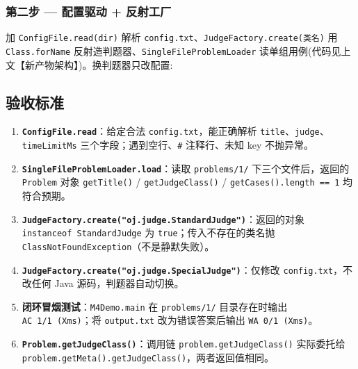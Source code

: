 \documentclass[
  11pt,
]{ctexart}
\newenvironment{Shaded}{\begin{snugshade}}{\end{snugshade}}
\newcommand{\AttributeTok}[1]{\textcolor[rgb]{0.13,0.29,0.53}{#1}}
\newcommand{\ExtensionTok}[1]{#1}
\newcommand{\FunctionTok}[1]{\textcolor[rgb]{0.13,0.29,0.53}{\textbf{#1}}}
\newcommand{\NormalTok}[1]{#1}
\newcommand{\StringTok}[1]{\textcolor[rgb]{0.31,0.60,0.02}{#1}}
\newcommand{\VariableTok}[1]{\textcolor[rgb]{0.00,0.00,0.00}{#1}}
\providecommand{\tightlist}{%
  \setlength{\itemsep}{0pt}\setlength{\parskip}{0pt}}
\begin{document}
\hypertarget{ux7b2cux4e8cux6b65-ux914dux7f6eux9a71ux52a8-ux53cdux5c04ux5de5ux5382}{%
\subsubsection{\texorpdfstring{第二步 \GC --- 配置驱动 +
反射工厂}{第二步 --- 配置驱动 + 反射工厂}}\label{ux7b2cux4e8cux6b65-ux914dux7f6eux9a71ux52a8-ux53cdux5c04ux5de5ux5382}}

加 \texttt{ConfigFile.read(dir)} 解析
\texttt{config.txt}、\texttt{JudgeFactory.create(类名)} 用
\texttt{Class.forName} 反射造判题器、\texttt{SingleFileProblemLoader}
读单组用例(代码见上文【新产物架构】)。换判题器只改配置:

\begin{Shaded}
\end{Shaded}

\hypertarget{ux9a8cux6536ux6807ux51c6-4}{%
\subsection{验收标准}\label{ux9a8cux6536ux6807ux51c6-4}}

\begin{enumerate}
\def\labelenumi{\arabic{enumi}.}
\tightlist
\item
  \textbf{\texttt{ConfigFile.read}}：给定合法
  \texttt{config.txt}，能正确解析
  \texttt{title}、\texttt{judge}、\texttt{timeLimitMs}
  三个字段；遇到空行、\texttt{\#} 注释行、未知 key 不抛异常。
\item
  \textbf{\texttt{SingleFileProblemLoader.load}}：读取
  \texttt{problems/1/} 下三个文件后，返回的 \texttt{Problem} 对象
  \texttt{getTitle()} / \texttt{getJudgeClass()} /
  \texttt{getCases().length\ ==\ 1} 均符合预期。
\item
  \textbf{\texttt{JudgeFactory.create("oj.judge.StandardJudge")}}：返回的对象
  \texttt{instanceof\ StandardJudge} 为
  \texttt{true}；传入不存在的类名抛
  \texttt{ClassNotFoundException}（不是静默失败）。
\item
  \textbf{\texttt{JudgeFactory.create("oj.judge.SpecialJudge")}}：仅修改
  \texttt{config.txt}，不改任何 Java 源码，判题器自动切换。
\item
  \textbf{闭环冒烟测试}：\texttt{M4Demo.main} 在 \texttt{problems/1/}
  目录存在时输出 \texttt{AC\ 1/1\ (Xms)}；将 \texttt{output.txt}
  改为错误答案后输出 \texttt{WA\ 0/1\ (Xms)}。
\item
  \textbf{\texttt{Problem.getJudgeClass()}}：调用链
  \texttt{problem.getJudgeClass()} 实际委托给
  \texttt{problem.getMeta().getJudgeClass()}，两者返回值相同。
\end{enumerate}
\end{document}
